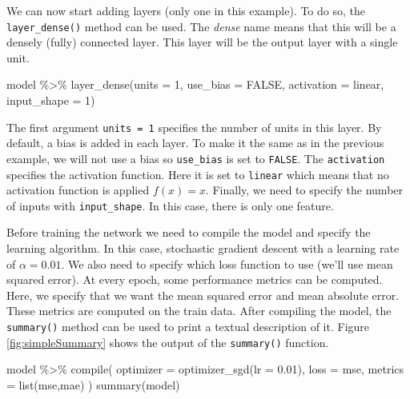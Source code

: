 \documentclass[
  11pt,
]{krantz}
\newenvironment{Shaded}{\begin{snugshade}}{\end{snugshade}}
\newcommand{\AttributeTok}[1]{\textcolor[rgb]{0.61,0.61,0.61}{#1}}
\newcommand{\ConstantTok}[1]{\textcolor[rgb]{0,0,0}{#1}}
\newcommand{\DecValTok}[1]{\textcolor[rgb]{0.06,0.06,0.06}{#1}}
\newcommand{\FloatTok}[1]{\textcolor[rgb]{0.06,0.06,0.06}{#1}}
\newcommand{\FunctionTok}[1]{\textcolor[rgb]{0,0,0}{#1}}
\newcommand{\NormalTok}[1]{#1}
\newcommand{\SpecialCharTok}[1]{\textcolor[rgb]{0,0,0}{#1}}
\newcommand{\StringTok}[1]{\textcolor[rgb]{0.5,0.5,0.5}{#1}}
\begin{document}
We can now start adding layers (only one in this example). To do so, the \texttt{layer\_dense()} method can be used. The \emph{dense} name means that this will be a densely (fully) connected layer. This layer will be the output layer with a single unit.

\begin{Shaded}
\begin{Highlighting}[]
\NormalTok{model }\SpecialCharTok{\%\textgreater{}\%}
  \FunctionTok{layer\_dense}\NormalTok{(}\AttributeTok{units =} \DecValTok{1}\NormalTok{,}
              \AttributeTok{use\_bias =} \ConstantTok{FALSE}\NormalTok{,}
              \AttributeTok{activation =} \StringTok{\textquotesingle{}linear\textquotesingle{}}\NormalTok{,}
              \AttributeTok{input\_shape =} \DecValTok{1}\NormalTok{)}
\end{Highlighting}
\end{Shaded}

The first argument \texttt{units\ =\ 1} specifies the number of units in this layer. By default, a bias is added in each layer. To make it the same as in the previous example, we will not use a bias so \texttt{use\_bias} is set to \texttt{FALSE}. The \texttt{activation} specifies the activation function. Here it is set to \texttt{\textquotesingle{}linear\textquotesingle{}} which means that no activation function is applied \(f(x)=x\). Finally, we need to specify the number of inputs with \texttt{input\_shape}. In this case, there is only one feature.

Before training the network we need to compile the model and specify the learning algorithm. In this case, stochastic gradient descent with a learning rate of \(\alpha=0.01\). We also need to specify which loss function to use (we'll use mean squared error). At every epoch, some performance metrics can be computed. Here, we specify that we want the mean squared error and mean absolute error. These metrics are computed on the train data. After compiling the model, the \texttt{summary()} method can be used to print a textual description of it. Figure \ref{fig:simpleSummary} shows the output of the \texttt{summary()} function.

\begin{Shaded}
\begin{Highlighting}[]
\NormalTok{model }\SpecialCharTok{\%\textgreater{}\%} \FunctionTok{compile}\NormalTok{(}
  \AttributeTok{optimizer =} \FunctionTok{optimizer\_sgd}\NormalTok{(}\AttributeTok{lr =} \FloatTok{0.01}\NormalTok{),}
  \AttributeTok{loss =} \StringTok{\textquotesingle{}mse\textquotesingle{}}\NormalTok{,}
  \AttributeTok{metrics =} \FunctionTok{list}\NormalTok{(}\StringTok{\textquotesingle{}mse\textquotesingle{}}\NormalTok{,}\StringTok{\textquotesingle{}mae\textquotesingle{}}\NormalTok{)}
\NormalTok{)}
\FunctionTok{summary}\NormalTok{(model)}
\end{Highlighting}
\end{Shaded}
\end{document}

